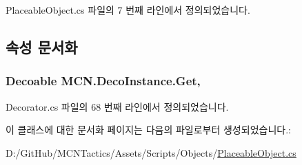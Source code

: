 Placeable\+Object.\+cs 파일의 7 번째 라인에서 정의되었습니다.



\subsection{속성 문서화}
\subsubsection[{\texorpdfstring{Get}{Get}}]{\setlength{\rightskip}{0pt plus 5cm}Decoable M\+C\+N.\+Deco\+Instance.\+Get\hspace{0.3cm}{\ttfamily [get]}, {\ttfamily [inherited]}}\hypertarget{class_m_c_n_1_1_deco_instance_af02857ad80446cb4fdd1bf982bda95c5}{}\label{class_m_c_n_1_1_deco_instance_af02857ad80446cb4fdd1bf982bda95c5}


Decorator.\+cs 파일의 68 번째 라인에서 정의되었습니다.



이 클래스에 대한 문서화 페이지는 다음의 파일로부터 생성되었습니다.\+:\begin{DoxyCompactItemize}
\item 
D\+:/\+Git\+Hub/\+M\+C\+N\+Tactics/\+Assets/\+Scripts/\+Objects/\hyperlink{_placeable_object_8cs}{Placeable\+Object.\+cs}\end{DoxyCompactItemize}
